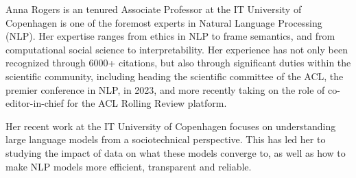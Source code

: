 Anna Rogers is an tenured Associate Professor at the IT University of Copenhagen is one of the foremost experts in Natural Language Processing (NLP). 
Her expertise ranges from ethics in NLP to frame semantics, and from computational social science to interpretability.
Her experience has not only been recognized through 6000+ citations, but also through significant duties within the scientific community, including heading the scientific committee of the ACL, the premier conference in NLP, in 2023, and more recently taking on the role of co-editor-in-chief for the ACL Rolling Review platform.

Her recent work at the IT University of Copenhagen focuses on understanding large language models from a sociotechnical perspective. 
This has led her to studying the impact of data on what these models converge to, as well as how to make NLP models more efficient, transparent and reliable.
